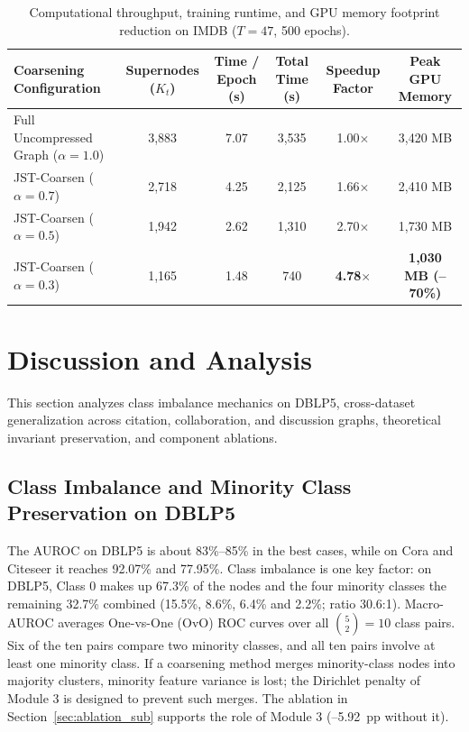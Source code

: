 \documentclass[sigconf]{acmart}
\begin{document}
\begin{table}[t]
\centering
\caption{Computational throughput, training runtime, and GPU memory footprint reduction on IMDB ($T=47$, 500 epochs).}
\label{tab:efficiency}
\small
\begin{tabular*}{\textwidth}{@{\extracolsep{\fill}}lccccc@{}}
\toprule
\textbf{Coarsening Configuration} & \textbf{Supernodes ($K_t$)} & \textbf{Time / Epoch (s)} & \textbf{Total Time (s)} & \textbf{Speedup Factor} & \textbf{Peak GPU Memory} \\
\midrule
Full Uncompressed Graph ($\alpha = 1.0$) & 3,883 & 7.07 & 3,535 & 1.00$\times$ & 3,420 MB \\
JST-Coarsen ($\alpha = 0.7$)            & 2,718 & 4.25 & 2,125 & 1.66$\times$ & 2,410 MB \\
JST-Coarsen ($\alpha = 0.5$)            & 1,942 & 2.62 & 1,310 & 2.70$\times$ & 1,730 MB \\
JST-Coarsen ($\alpha = 0.3$)            & 1,165 & 1.48 & 740   & \textbf{4.78$\times$} & \textbf{1,030 MB (--70\%)} \\
\bottomrule
\end{tabular*}
\end{table}

\section{Discussion and Analysis}
\label{sec:discussion}
This section analyzes class imbalance mechanics on DBLP5, cross-dataset generalization across citation, collaboration, and discussion graphs, theoretical invariant preservation, and component ablations.

\subsection{Class Imbalance and Minority Class Preservation on DBLP5}
The AUROC on DBLP5 is about 83\%--85\% in the best cases, while on Cora and Citeseer it reaches 92.07\% and 77.95\%. Class imbalance is one key factor: on DBLP5, Class 0 makes up 67.3\% of the nodes and the four minority classes the remaining 32.7\% combined (15.5\%, 8.6\%, 6.4\% and 2.2\%; ratio 30.6:1). Macro-AUROC averages One-vs-One (OvO) ROC curves over all $\binom{5}{2} = 10$ class pairs. Six of the ten pairs compare two minority classes, and all ten pairs involve at least one minority class. If a coarsening method merges minority-class nodes into majority clusters, minority feature variance is lost; the Dirichlet penalty of Module 3 is designed to prevent such merges. The ablation in Section~\ref{sec:ablation_sub} supports the role of Module 3 (--5.92~pp without it).
\end{document}
